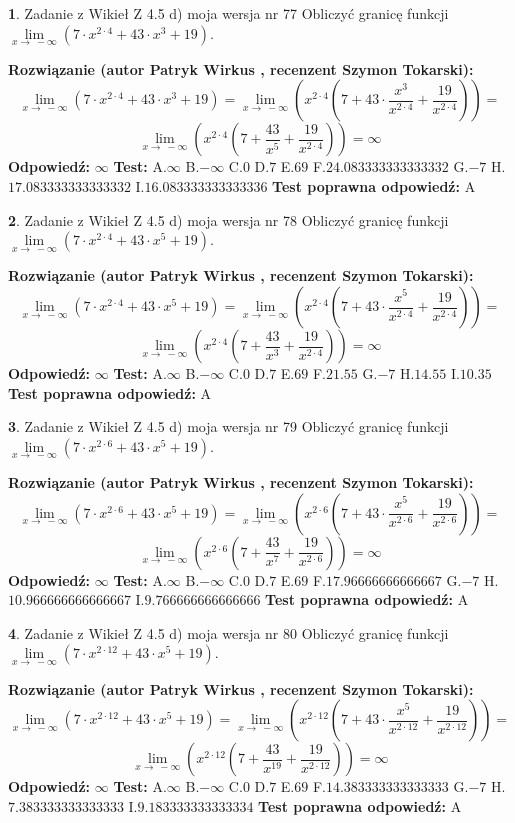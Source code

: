 \documentclass[12pt, a4paper]{article}
\theoremstyle{definition} %
\newtheorem{zad}{}
\newcommand{\zadStart}[1]{\begin{zad}#1\newline}
\newcommand{\zadStop}{\end{zad}}
\newcommand{\rozwStart}[2]{\noindent \textbf{Rozwiązanie (autor #1 , recenzent #2): }\newline}
\newcommand{\rozwStop}{\newline}
\newcommand{\odpStart}{\noindent \textbf{Odpowiedź:}\newline}
\newcommand{\odpStop}{\newline}
\newcommand{\testStart}{\noindent \textbf{Test:}\newline}
\newcommand{\testStop}{\newline}
\newcommand{\kluczStart}{\noindent \textbf{Test poprawna odpowiedź:}\newline}
\newcommand{\kluczStop}{\newline}
\begin{document}
\zadStart{Zadanie z Wikieł Z 4.5 d) moja wersja nr 77}
Obliczyć granicę funkcji  $\lim\limits_{x\to\ -\infty}(7 \cdot x^{2\cdot4}+43 \cdot x^{3}+19)$.
\zadStop
\rozwStart{Patryk Wirkus}{Szymon Tokarski}
$$\lim\limits_{x\to\ -\infty}(7 \cdot x^{2\cdot4}+43 \cdot x^{3}+19) = \lim\limits_{x\to\ -\infty}(x^{2\cdot4}(7 +43 \cdot \frac{x^{3}}{x^{2\cdot4}}+\frac{19}{x^{2\cdot4}})) =$$ $$\lim\limits_{x\to\ -\infty}(x^{2\cdot4}(7 +\frac{43}{x^{5}}+\frac{19}{x^{2\cdot4}})) =\infty$$
\rozwStop
\odpStart
$\infty$
\odpStop
\testStart
A.$\infty$ B.$-\infty$ C.$0$ D.$7$ E.$69$
F.$24.083333333333332$ G.$-7$
H.$17.083333333333332$
I.$16.083333333333336$
\testStop
\kluczStart
A
\kluczStop



\zadStart{Zadanie z Wikieł Z 4.5 d) moja wersja nr 78}
Obliczyć granicę funkcji  $\lim\limits_{x\to\ -\infty}(7 \cdot x^{2\cdot4}+43 \cdot x^{5}+19)$.
\zadStop
\rozwStart{Patryk Wirkus}{Szymon Tokarski}
$$\lim\limits_{x\to\ -\infty}(7 \cdot x^{2\cdot4}+43 \cdot x^{5}+19) = \lim\limits_{x\to\ -\infty}(x^{2\cdot4}(7 +43 \cdot \frac{x^{5}}{x^{2\cdot4}}+\frac{19}{x^{2\cdot4}})) =$$ $$\lim\limits_{x\to\ -\infty}(x^{2\cdot4}(7 +\frac{43}{x^{3}}+\frac{19}{x^{2\cdot4}})) =\infty$$
\rozwStop
\odpStart
$\infty$
\odpStop
\testStart
A.$\infty$ B.$-\infty$ C.$0$ D.$7$ E.$69$
F.$21.55$ G.$-7$
H.$14.55$
I.$10.35$
\testStop
\kluczStart
A
\kluczStop



\zadStart{Zadanie z Wikieł Z 4.5 d) moja wersja nr 79}
Obliczyć granicę funkcji  $\lim\limits_{x\to\ -\infty}(7 \cdot x^{2\cdot6}+43 \cdot x^{5}+19)$.
\zadStop
\rozwStart{Patryk Wirkus}{Szymon Tokarski}
$$\lim\limits_{x\to\ -\infty}(7 \cdot x^{2\cdot6}+43 \cdot x^{5}+19) = \lim\limits_{x\to\ -\infty}(x^{2\cdot6}(7 +43 \cdot \frac{x^{5}}{x^{2\cdot6}}+\frac{19}{x^{2\cdot6}})) =$$ $$\lim\limits_{x\to\ -\infty}(x^{2\cdot6}(7 +\frac{43}{x^{7}}+\frac{19}{x^{2\cdot6}})) =\infty$$
\rozwStop
\odpStart
$\infty$
\odpStop
\testStart
A.$\infty$ B.$-\infty$ C.$0$ D.$7$ E.$69$
F.$17.96666666666667$ G.$-7$
H.$10.966666666666667$
I.$9.766666666666666$
\testStop
\kluczStart
A
\kluczStop



\zadStart{Zadanie z Wikieł Z 4.5 d) moja wersja nr 80}
Obliczyć granicę funkcji  $\lim\limits_{x\to\ -\infty}(7 \cdot x^{2\cdot12}+43 \cdot x^{5}+19)$.
\zadStop
\rozwStart{Patryk Wirkus}{Szymon Tokarski}
$$\lim\limits_{x\to\ -\infty}(7 \cdot x^{2\cdot12}+43 \cdot x^{5}+19) = \lim\limits_{x\to\ -\infty}(x^{2\cdot12}(7 +43 \cdot \frac{x^{5}}{x^{2\cdot12}}+\frac{19}{x^{2\cdot12}})) =$$ $$\lim\limits_{x\to\ -\infty}(x^{2\cdot12}(7 +\frac{43}{x^{19}}+\frac{19}{x^{2\cdot12}})) =\infty$$
\rozwStop
\odpStart
$\infty$
\odpStop
\testStart
A.$\infty$ B.$-\infty$ C.$0$ D.$7$ E.$69$
F.$14.383333333333333$ G.$-7$
H.$7.383333333333333$
I.$9.183333333333334$
\testStop
\kluczStart
A
\kluczStop
\end{document}
